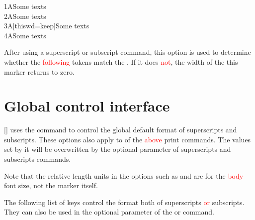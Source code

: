 \documentclass[load-preamble+]{cnltx-doc}
\renewcommand{\emph}[1]{\textcolor{red}{#1}}
\begin{document}
\begin{options}
\begin{demohigh}
1ASome texts \\
2ASome texts \\
3A[thiswd=keep]Some texts \\
4ASome texts
\end{demohigh}
  After using a superscript or subscript command, this option is used to determine whether the \textcolor{red}{following} tokens match the . If it does \textcolor{red}{not}, the width of the this marker returns to zero.
\begin{codehigh}
\newcommand{\mysp}[2][]{\super[regex=\c{mysb},#1]{#2}}
\newcommand{\mysb}[2][]{\sub[regex=\c{mysp},#1]{#2}}
\end{codehigh}
\end{options}

\section{Global control interface}
\label{sec:global control interface}
\begin{commands}
  []
   uses the  command to control the global default format of superscripts and subscripts. These options also apply to  of the \textcolor{red}{above} print commands. The values set by it will be overwritten by the optional parameter of superscripts and subscripts commands.

  Note that the relative length units in the options such as  and  are for the \textcolor{red}{body} font size, not the marker itself.

  The following list of keys control the format both of superscripts \emph{or} subscripts. They can also be used in the optional parameter of the  or  command.
\end{commands}
\end{document}
